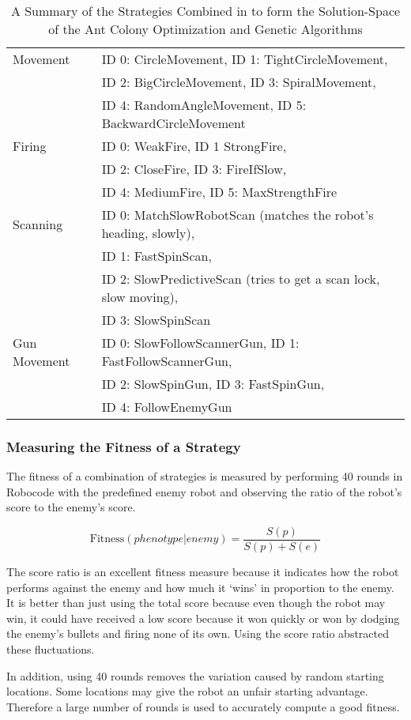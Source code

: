 \begin{table*}
\centering
\begin{tabular}{|l|l|}
\hline
Movement & ID 0: CircleMovement, ID 1: TightCircleMovement, \\ &  ID 2: BigCircleMovement,
ID 3: SpiralMovement, \\ & ID 4: RandomAngleMovement, ID 5: BackwardCircleMovement \\
\hline
Firing & ID 0: WeakFire, ID 1 StrongFire, \\ &  ID 2: CloseFire, ID 3: FireIfSlow, \\ & ID 4: MediumFire, ID 5: MaxStrengthFire \\
\hline
Scanning & ID 0: MatchSlowRobotScan (matches the robot's heading, slowly),\\ &  ID 1: FastSpinScan, \\ & ID 2: SlowPredictiveScan (tries to get a scan lock, slow moving), \\ &  ID 3: SlowSpinScan \\
\hline
Gun Movement & ID 0: SlowFollowScannerGun, ID 1: FastFollowScannerGun, \\ & 
 ID 2: SlowSpinGun, ID 3: FastSpinGun, \\ &  ID 4: FollowEnemyGun \\
\hline
\end{tabular}
\caption{A Summary of the Strategies Combined in to form the Solution-Space of the Ant Colony Optimization and Genetic Algorithms}
\label{table:strategies}
\end{table*}

\subsubsection{Measuring the Fitness of a Strategy}

The fitness of a combination of strategies is measured by performing 40 rounds in Robocode with the predefined enemy robot and observing the ratio of the robot's score to the enemy's score.

\begin{equation}
\label{eqn:fitness}
\text{Fitness}\left({phenotype}|{enemy}\right) = 
\frac{S(p)}{S(p) + S(e)}
\end{equation}

The score ratio is an excellent fitness measure because it indicates how the robot performs against the enemy and how much it `wins' in proportion to the enemy. It is better than just using the total score because even though the robot may win, it could have received a low score because it won quickly or won by dodging the enemy's bullets and firing none of its own. Using the score ratio abstracted these fluctuations. 

In addition, using 40 rounds removes the variation caused by random starting locations. Some locations may give the robot an unfair starting advantage. Therefore a large number of rounds is used to accurately compute a good fitness.


